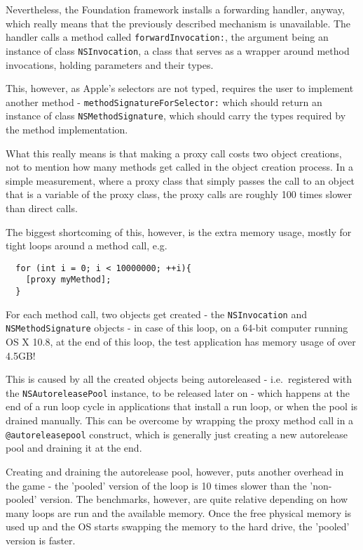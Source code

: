 Nevertheless, the Foundation framework installs a forwarding handler, anyway, which really means that the previously described mechanism is unavailable. The handler calls a method called \verb=forwardInvocation:=, the argument being an instance of class \verb=NSInvocation=, a class that serves as a wrapper around method invocations, holding parameters and their types.

This, however, as Apple's selectors are not typed, requires the user to implement another method - \verb=methodSignatureForSelector:= which should return an instance of class \verb=NSMethodSignature=, which should carry the types required by the method implementation.

What this really means is that making a proxy call costs two object creations, not to mention how many methods get called in the object creation process. In a simple measurement, where a proxy class that simply passes the call to an object that is a variable of the proxy class, the proxy calls are roughly 100 times slower than direct calls.

The biggest shortcoming of this, however, is the extra memory usage, mostly for tight loops around a method call, e.g.

\begin{verbatim}
  for (int i = 0; i < 10000000; ++i){
    [proxy myMethod];
  }
\end{verbatim}

For each method call, two objects get created - the \verb=NSInvocation= \newline{}and \verb=NSMethodSignature= objects - in case of this loop, on a 64-bit computer running OS X 10.8, at the end of this loop, the test application has memory usage of over 4.5GB!

This is caused by all the created objects being autoreleased - i.e.\ registered with the \verb=NSAutoreleasePool= instance, to be released later on - which happens at the end of a run loop cycle in applications that install a run loop, or when the pool is drained manually. This can be overcome by wrapping the proxy method call in a \verb=@autoreleasepool= construct, which is generally just creating a new autorelease pool and draining it at the end.

Creating and draining the autorelease pool, however, puts another overhead in the game - the 'pooled' version of the loop is 10 times slower than the 'non-pooled' version. The benchmarks, however, are quite relative depending on how many loops are run and the available memory. Once the free physical memory is used up and the OS starts swapping the memory to the hard drive, the 'pooled' version is faster.

